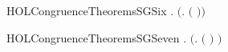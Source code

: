 \begin{SaveVerbatim}{HOLCongruenceTheoremsSGSix}
\HOLTokenTurnstile{} \HOLSymConst{\HOLTokenForall{}} .   \HOLSymConst{\HOLTokenImp{}}  \ensuremath{(}\HOLTokenLambda{}.   \ensuremath{(} \ensuremath{)}\ensuremath{)}
\end{SaveVerbatim}
\newcommand{\HOLCongruenceTheoremsSGSix}{\UseVerbatim{HOLCongruenceTheoremsSGSix}}
\begin{SaveVerbatim}{HOLCongruenceTheoremsSGSeven}
\HOLTokenTurnstile{} \HOLSymConst{\HOLTokenForall{}} .   \HOLSymConst{\HOLTokenImp{}}  \ensuremath{(}\HOLTokenLambda{}.  \ensuremath{(} \ensuremath{)} \ensuremath{)}
\end{SaveVerbatim}
\newcommand{\HOLCongruenceTheoremsSGSeven}{\UseVerbatim{HOLCongruenceTheoremsSGSeven}}
